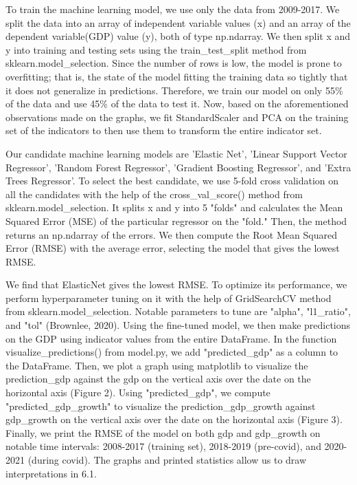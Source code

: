 \documentclass{article}
\begin{document}
To train the machine learning model, we use only the data from 2009-2017. We split the data into an array of independent variable values (x) and an array of the dependent variable(GDP) value (y), both of type np.ndarray. We then split x and y into training and testing sets using the train\_test\_split method from sklearn.model\_selection. Since the number of rows is low, the model is prone to overfitting; that is, the state of the model fitting the training data so tightly that it does not generalize in predictions. Therefore, we train our model on only 55\% of the data and use 45\% of the data to test it. Now, based on the aforementioned observations made on the graphs, we fit StandardScaler and PCA on the training set of the indicators to then use them to transform the entire indicator set.
 
Our candidate machine learning models are 'Elastic Net', 'Linear Support Vector Regressor', 'Random Forest Regressor', 'Gradient Boosting Regressor', and 'Extra Trees Regressor'. To select the best candidate, we use 5-fold cross validation on all the candidates with the help of the cross\_val\_score() method from sklearn.model\_selection. It splits x and y into 5 "folds" and calculates the Mean Squared Error (MSE) of the particular regressor on the "fold." Then, the method returns an np.ndarray of the errors. We then compute the Root Mean Squared Error (RMSE) with the average error, selecting the model that gives the lowest RMSE.

We find that ElasticNet gives the lowest RMSE. To optimize its performance, we perform hyperparameter tuning on it with the help of GridSearchCV method from sklearn.model_selection. Notable parameters to tune are "alpha", "l1_ratio", and "tol" (Brownlee, 2020). Using the fine-tuned model, we then make predictions on the GDP using indicator values from the entire DataFrame. In the function visualize_predictions() from model.py, we add "predicted_gdp" as a column to the DataFrame. Then, we plot a graph using matplotlib to visualize the prediction_gdp against the gdp on the vertical axis over the date on the horizontal axis (Figure 2). Using "predicted_gdp", we compute "predicted_gdp_growth" to visualize the prediction_gdp_growth against gdp_growth on the vertical axis over the date on the horizontal axis (Figure 3). Finally, we print the RMSE of the model on both gdp and gdp_growth on notable time intervals: 2008-2017 (training set), 2018-2019 (pre-covid), and 2020-2021 (during covid). The graphs and printed statistics allow us to draw interpretations in 6.1.
\end{document}
